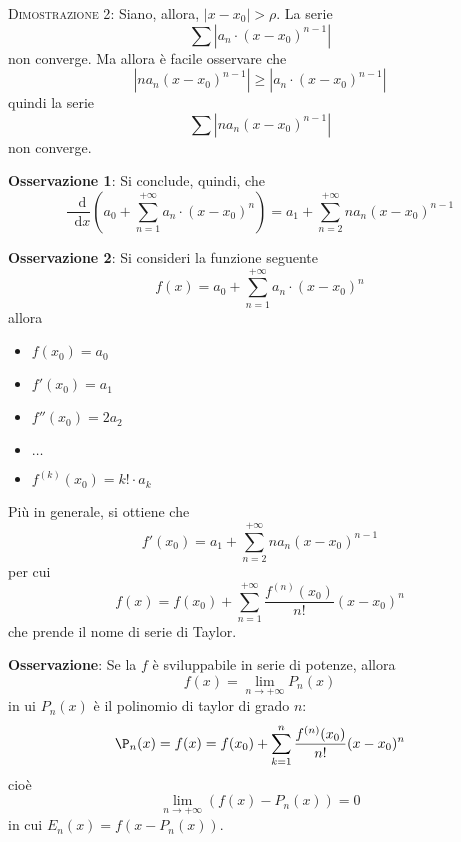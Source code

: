 \documentclass[a4paper]{extarticle}
\newcommand*\dif{\mathop{}\!\mathrm{d}}
\begin{document}
\vspace{2em}
\noindent
\normalfont \normalsize
\textsc{Dimostrazione 2}: Siano, allora, $\left \vert x - x_0 \right \vert > \rho$. La serie
\[\sum \left \vert a_n \cdot (x-x_0)^{n-1}\right \vert\]
non converge. Ma allora è facile osservare che
\[\left \vert n a_n (x-x_0)^{n-1} \right \vert \geq \left \vert a_n \cdot (x-x_0)^{n-1} \right \vert\]
quindi la serie
\[\sum \left \vert n a_n (x-x_0)^{n-1} \right \vert\]
non converge.

\vspace{1em}
\noindent
\textbf{Osservazione 1}: Si conclude, quindi, che
\[\frac{\dif}{\dif x} \left(a_0 + \sum_{n=1}^{+\infty} a_n \cdot (x-x_0)^n\right) = a_1 + \sum_{n=2}^{+\infty} n a_n (x-x_0)^{n-1}\]

\vspace{1em}
\noindent
\textbf{Osservazione 2}: Si consideri la funzione seguente
\[f(x) = a_0 + \sum_{n=1}^{+\infty} a_n \cdot (x-x_0)^n\]
allora
\begin{itemize}
    \item $f(x_0) = a_0$
    \item $f'(x_0) = a_1$
    \item $f''(x_0)  = 2a_2$
    \item $\dots$
    \item $f^{(k)}(x_0) = k! \cdot a_k $
\end{itemize}
Più in generale, si ottiene che
\[f'(x_0) = a_1 + \sum_{n=2}^{+\infty} n a_n (x-x_0)^{n-1}\]
per cui
\[f(x) = f(x_0) + \sum_{n=1}^{+\infty} \frac{f^{(n)}(x_0)}{n!} (x-x_0)^n\]
che prende il nome di serie di Taylor.

\vspace{1em}
\noindent
\textbf{Osservazione}: Se la $f$ è sviluppabile in serie di potenze, allora
\[f(x) = \lim_{n \to +\infty} P_n(x)\]
in ui $P_n(x)$ è il polinomio di taylor di grado $n$:
\[\P_n(x) = f(x) = f(x_0) + \sum_{k=1}^n \frac{f^{(n)}(x_0)}{n!} (x-x_0)^n\]
cioè
\[\lim_{n \to +\infty} \left(f(x) - P_n(x)\right) = 0\]
in cui $E_n(x) = f(x-P_n(x))$.
\end{document}
